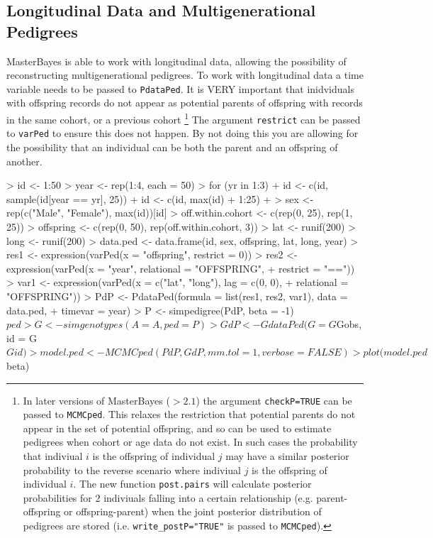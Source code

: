 \documentclass{article}
\begin{document}
\subsection{Longitudinal Data and Multigenerational Pedigrees}
\label{pedigree-sec}

MasterBayes is able to work with longitudinal data, allowing the possibility of reconstructing multigenerational pedigrees.  To work with longitudinal data a time variable needs to be passed to \texttt{PdataPed}.  It is VERY important that inidviduals with offspring records do not appear as potential parents of offspring with records in the same cohort, or a previous cohort \footnote{In later versions of MasterBayes ($>2.1$) the argument \texttt{checkP=TRUE} can be passed to \texttt{MCMCped}.  This relaxes the restriction that potential parents do not appear in the set of potential offspring, and so can be used to estimate pedigrees when cohort or age data do not exist.  In such cases the probability that indiviual $i$ is the offspring of individual $j$ may have a similar posterior probability to the reverse scenario where indiviual $j$ is the offspring of individual $i$.  The new function \texttt{post.pairs} will calculate posterior probabilities for 2 indiviuals falling into a certain relationship (e.g. parent-offspring or offspring-parent) when the joint posterior distribution of pedigrees are stored (i.e. \texttt{write\_postP="TRUE"} is passed to \texttt{MCMCped}).}   The argument \texttt{restrict} can be passed to \texttt{varPed} to ensure this does not happen. By not doing this you are allowing for the possibility that an individual can be both the parent and an offspring of another.\\  

\begin{Schunk}
\begin{Sinput}
> id <- 1:50
> year <- rep(1:4, each = 50)
> for (yr in 1:3) {
+     id <- c(id, sample(id[year == yr], 25))
+     id <- c(id, max(id) + 1:25)
+ }
> sex <- rep(c("Male", "Female"), max(id))[id]
> off.within.cohort <- c(rep(0, 25), rep(1, 25))
> offspring <- c(rep(0, 50), rep(off.within.cohort, 3))
> lat <- runif(200)
> long <- runif(200)
> data.ped <- data.frame(id, sex, offspring, lat, long, year)
> res1 <- expression(varPed(x = "offspring", restrict = 0))
> res2 <- expression(varPed(x = "year", relational = "OFFSPRING", 
+     restrict = "=="))
> var1 <- expression(varPed(x = c("lat", "long"), lag = c(0, 0), 
+     relational = "OFFSPRING"))
> PdP <- PdataPed(formula = list(res1, res2, var1), data = data.ped, 
+     timevar = year)
> P <- simpedigree(PdP, beta = -1)$ped
> G <- simgenotypes(A = A, ped = P)
> GdP <- GdataPed(G = G$Gobs, id = G$Gid)
> model.ped <- MCMCped(PdP, GdP, mm.tol = 1, verbose = FALSE)
> plot(model.ped$beta)
\end{Sinput}
\end{Schunk}
\end{document}

